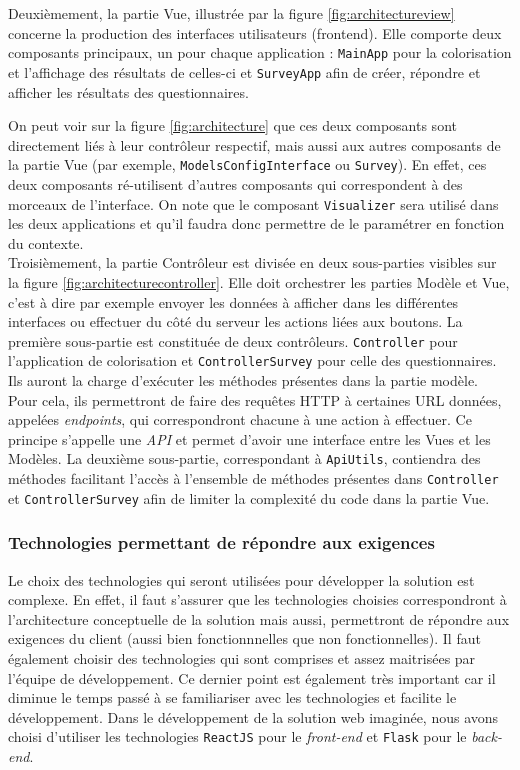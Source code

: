 \documentclass{article}
\begin{document}
Deuxièmement, la partie Vue, illustrée par la figure \ref{fig:architectureview} concerne la production des interfaces utilisateurs (frontend).
Elle comporte deux composants principaux, un pour chaque application : \texttt{MainApp} pour la colorisation et l'affichage des résultats de celles-ci et \texttt{SurveyApp} afin de créer, répondre et afficher les résultats des questionnaires.

On peut voir sur la figure \ref{fig:architecture} que ces deux composants sont directement liés à leur contrôleur respectif, mais aussi aux autres composants de la partie Vue (par exemple, \texttt{ModelsConfigInterface} ou \texttt{Survey}). 
En effet, ces deux composants ré-utilisent d'autres composants qui correspondent à des morceaux de l'interface.
On note que le composant \texttt{Visualizer} sera utilisé dans les deux applications et qu'il faudra donc permettre de le paramétrer en fonction du contexte. \\

Troisièmement, la partie Contrôleur est divisée en deux sous-parties visibles sur la figure \ref{fig:architecturecontroller}. 
Elle doit orchestrer les parties Modèle et Vue, c'est à dire par exemple envoyer les données à afficher dans les différentes interfaces ou effectuer du côté du serveur les actions liées aux boutons.
La première sous-partie est constituée de deux contrôleurs. \texttt{Controller} pour l'application de colorisation et \texttt{ControllerSurvey} pour celle des questionnaires. 
Ils auront la charge d'exécuter les méthodes présentes dans la partie modèle.
Pour cela, ils permettront de faire des requêtes HTTP à certaines URL données, appelées \emph{endpoints}, qui correspondront chacune à une action à effectuer. 
Ce principe s'appelle une \emph{API} et permet d'avoir une interface entre les Vues et les Modèles.
La deuxième sous-partie, correspondant à \texttt{ApiUtils}, contiendra des méthodes facilitant l'accès à l'ensemble de méthodes présentes dans \texttt{Controller} et \texttt{ControllerSurvey} afin de limiter la complexité du code dans la partie Vue.

\subsubsection{Technologies permettant de répondre aux exigences}

Le choix des technologies qui seront utilisées pour développer la solution est complexe. En effet, il faut s'assurer que les
technologies choisies correspondront à l'architecture conceptuelle de la solution mais aussi, permettront de répondre aux exigences du client
(aussi bien fonctionnnelles que non fonctionnelles). Il faut également choisir des technologies qui sont comprises et assez maitrisées par l'équipe
de développement. Ce dernier point est également très important car il diminue le temps passé à se familiariser avec les technologies et facilite le développement. 
Dans le développement de la solution web imaginée, nous avons choisi d'utiliser les technologies \texttt{ReactJS} pour le \textit{front-end} et  \texttt{Flask} pour le \textit{back-end}.\\
\end{document}

